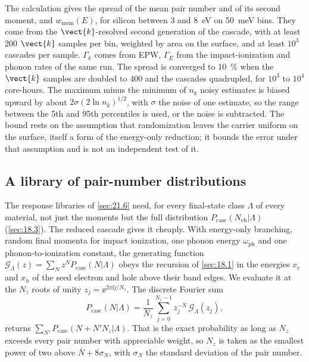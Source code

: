 The calculation gives the spread of the mean pair number and of its second moment, and $w_{\mathrm{mem}}(E)$, for silicon between 3 and \SI{8}{eV} on \SI{50}{meV} bins. They come from the $\vect{k}$-resolved second generation of the cascade, with at least 200 $\vect{k}$ samples per bin, weighted by area on the surface, and at least $10^3$ cascades per sample. $\varGamma_k$ comes from EPW, $\varGamma_E$ from the impact-ionization and phonon rates of the same run. The spread is converged to \SI{10}{\percent} when the $\vect{k}$ samples are doubled to 400 and the cascades quadrupled, for $10^3$ to $10^4$ core-hours. The maximum minus the minimum of $n_k$ noisy estimates is biased upward by about $2\sigma(2\ln n_k)^{1/2}$, with $\sigma$ the noise of one estimate, so the range between the 5th and 95th percentiles is used, or the noise is subtracted. The bound rests on the assumption that randomization leaves the carrier uniform on the surface, itself a form of the energy-only reduction; it bounds the error under that assumption and is not an independent test of it.

\subsection{A library of pair-number distributions}

The response libraries of \cref{sec:21.6} need, for every final-state class $\Lambda$ of every material, not just the moments but the full distribution $P_{\mathrm{casc}}(N_{\mathrm{eh}}|\Lambda)$ (\cref{sec:18.3}). The reduced cascade gives it cheaply. With energy-only branching, random final momenta for impact ionization, one phonon energy $\omega_{\mathrm{ph}}$ and one phonon-to-ionization constant, the generating function $\mathcal{G}_\Lambda(z) = \sum_Nz^NP_{\mathrm{casc}}(N|\Lambda)$ obeys the recursion of \cref{sec:18.1} in the energies $x_e$ and $x_h$ of the seed electron and hole above their band edges. We evaluate it at the $N_z$ roots of unity $z_j = \ee^{2\pi\ii j/N_z}$. The discrete Fourier sum
\begin{equation}
  P_{\mathrm{casc}}(N|\Lambda) = \frac{1}{N_z}\sum_{j=0}^{N_z-1}z_j^{-N}\,\mathcal{G}_\Lambda(z_j) ,
  \label{eq:E.24-dft}
\end{equation}
returns $\sum_{N'}P_{\mathrm{casc}}(N + N'N_z|\Lambda)$. That is the exact probability as long as $N_z$ exceeds every pair number with appreciable weight, so $N_z$ is taken as the smallest power of two above $\bar N + 8\sigma_N$, with $\sigma_N$ the standard deviation of the pair number.

